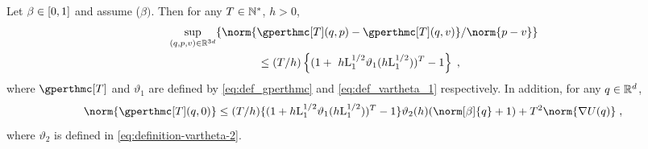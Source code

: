 \begin{lemma}
\label{lem:inverse_1}
Let $\beta \in \left[0,1\right]$ and assume ($\beta)$. Then for any $T \in \mathbb{N}^{*}$, $h >0$,
\begin{align}
\label{eq:lem:inverse_1}
  &  \sup_{(\q,\p,v) \in \rset^{3d}} \{ \norm{ \gperthmc[T](q,\p) - \gperthmc[T](q,v)} / \norm{\p-v} \} \\
  & \qquad \qquad \qquad \qquad  \leq   (T/h)  \left\{ (1+\ h \constzero^{1/2} \vartheta_1(h \constzero^{1/2}))^T - 1 \right\} \eqsp,
\end{align}
where  $\gperthmc[T]$ and $\vartheta_1$ are defined by  \eqref{eq:def_gperthmc} and \eqref{eq:def_vartheta_1} respectively.
  In addition, for any $q \in \mathbb{R}^d$,
  \begin{equation}
    \label{eq:lem:inverse_2}
    \norm{\gperthmc[T](q,0)} \leq  (T/h)  \{ (1+h \constzero^{1/2} \vartheta_1(h \constzero^{1/2} ))^{T}-1\}  \vartheta_2(h) (\norm[\beta]{q} +1)  + T^2 \norm{\nabla U(q)} \eqsp,
  \end{equation}
  where $\vartheta_2$ is defined in \eqref{eq:definition-vartheta-2}.
\end{lemma}
